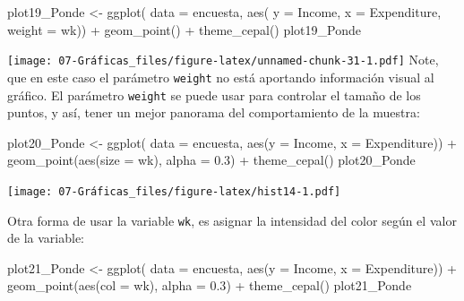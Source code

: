 \documentclass[
  12pt,
]{book}
\newenvironment{Shaded}{\begin{snugshade}}{\end{snugshade}}
\newcommand{\AttributeTok}[1]{\textcolor[rgb]{0.77,0.63,0.00}{#1}}
\newcommand{\FloatTok}[1]{\textcolor[rgb]{0.00,0.00,0.81}{#1}}
\newcommand{\FunctionTok}[1]{\textcolor[rgb]{0.00,0.00,0.00}{#1}}
\newcommand{\NormalTok}[1]{#1}
\newcommand{\OtherTok}[1]{\textcolor[rgb]{0.56,0.35,0.01}{#1}}
\newcommand{\SpecialCharTok}[1]{\textcolor[rgb]{0.00,0.00,0.00}{#1}}
\begin{document}
\begin{Shaded}
\begin{Highlighting}[]
\NormalTok{plot19\_Ponde }\OtherTok{\textless{}{-}} \FunctionTok{ggplot}\NormalTok{( }
  \AttributeTok{data =}\NormalTok{ encuesta,}
      \FunctionTok{aes}\NormalTok{(}
      \AttributeTok{y =}\NormalTok{ Income,}
      \AttributeTok{x =}\NormalTok{ Expenditure,}
      \AttributeTok{weight =}\NormalTok{ wk)) }\SpecialCharTok{+}
  \FunctionTok{geom\_point}\NormalTok{() }\SpecialCharTok{+}
  \FunctionTok{theme\_cepal}\NormalTok{()}
\NormalTok{plot19\_Ponde}
\end{Highlighting}
\end{Shaded}

\texttt{[image: 07-Gráficas\_files/figure-latex/unnamed-chunk-31-1.pdf]}
Note, que en este caso el parámetro \texttt{weight} no está aportando información visual al gráfico. El parámetro \texttt{weight} se puede usar para controlar el tamaño de los puntos, y así, tener un mejor panorama del comportamiento de la muestra:

\begin{Shaded}
\begin{Highlighting}[]
\NormalTok{plot20\_Ponde }\OtherTok{\textless{}{-}} \FunctionTok{ggplot}\NormalTok{(}
  \AttributeTok{data =}\NormalTok{ encuesta,}
    \FunctionTok{aes}\NormalTok{(}\AttributeTok{y =}\NormalTok{ Income, }\AttributeTok{x =}\NormalTok{ Expenditure)) }\SpecialCharTok{+}
  \FunctionTok{geom\_point}\NormalTok{(}\FunctionTok{aes}\NormalTok{(}\AttributeTok{size =}\NormalTok{ wk), }\AttributeTok{alpha =} \FloatTok{0.3}\NormalTok{) }\SpecialCharTok{+}
  \FunctionTok{theme\_cepal}\NormalTok{()}
\NormalTok{plot20\_Ponde}
\end{Highlighting}
\end{Shaded}

\texttt{[image: 07-Gráficas\_files/figure-latex/hist14-1.pdf]}

Otra forma de usar la variable \texttt{wk}, es asignar la intensidad del color según el valor de la variable:

\begin{Shaded}
\begin{Highlighting}[]
\NormalTok{plot21\_Ponde }\OtherTok{\textless{}{-}} \FunctionTok{ggplot}\NormalTok{(}
  \AttributeTok{data =}\NormalTok{ encuesta,}
    \FunctionTok{aes}\NormalTok{(}\AttributeTok{y =}\NormalTok{ Income, }\AttributeTok{x =}\NormalTok{ Expenditure)) }\SpecialCharTok{+}
  \FunctionTok{geom\_point}\NormalTok{(}\FunctionTok{aes}\NormalTok{(}\AttributeTok{col =}\NormalTok{ wk), }\AttributeTok{alpha =} \FloatTok{0.3}\NormalTok{) }\SpecialCharTok{+}
  \FunctionTok{theme\_cepal}\NormalTok{()}
\NormalTok{plot21\_Ponde}
\end{Highlighting}
\end{Shaded}
\end{document}

